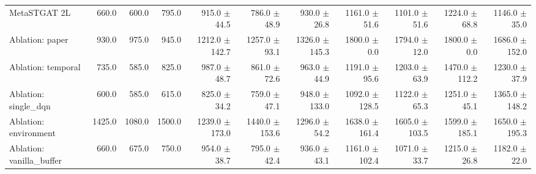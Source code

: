\begin{table}
\begin{tabular}{@{}lrrrrrrrrrr@{}}
    MetaSTGAT 2L              & 660.0   & 600.0   & 795.0   & 915.0 {\fontsize{4}{4}\selectfont$\pm$44.5}   & 786.0 {\fontsize{4}{4}\selectfont$\pm$48.9}   & 930.0 {\fontsize{4}{4}\selectfont$\pm$26.8}   & 1161.0 {\fontsize{4}{4}\selectfont$\pm$51.6}  & 1101.0 {\fontsize{4}{4}\selectfont$\pm$51.6}  & 1224.0 {\fontsize{4}{4}\selectfont$\pm$68.8}  & 1146.0 {\fontsize{4}{4}\selectfont$\pm$35.0}  \\
    Ablation: paper           & 930.0   & 975.0   & 945.0   & 1212.0 {\fontsize{4}{4}\selectfont$\pm$142.7} & 1257.0 {\fontsize{4}{4}\selectfont$\pm$93.1}  & 1326.0 {\fontsize{4}{4}\selectfont$\pm$145.3} & 1800.0 {\fontsize{4}{4}\selectfont$\pm$0.0}   & 1794.0 {\fontsize{4}{4}\selectfont$\pm$12.0}  & 1800.0 {\fontsize{4}{4}\selectfont$\pm$0.0}   & 1686.0 {\fontsize{4}{4}\selectfont$\pm$152.0} \\
    Ablation: temporal        & 735.0   & 585.0   & 825.0   & 987.0 {\fontsize{4}{4}\selectfont$\pm$48.7}   & 861.0 {\fontsize{4}{4}\selectfont$\pm$72.6}   & 963.0 {\fontsize{4}{4}\selectfont$\pm$44.9}   & 1191.0 {\fontsize{4}{4}\selectfont$\pm$95.6}  & 1203.0 {\fontsize{4}{4}\selectfont$\pm$63.9}  & 1470.0 {\fontsize{4}{4}\selectfont$\pm$112.2} & 1230.0 {\fontsize{4}{4}\selectfont$\pm$37.9}  \\
    Ablation: single\_dqn     & 600.0   & 585.0   & 615.0   & 825.0 {\fontsize{4}{4}\selectfont$\pm$34.2}   & 759.0 {\fontsize{4}{4}\selectfont$\pm$47.1}   & 948.0 {\fontsize{4}{4}\selectfont$\pm$133.0}  & 1092.0 {\fontsize{4}{4}\selectfont$\pm$128.5} & 1122.0 {\fontsize{4}{4}\selectfont$\pm$65.3}  & 1251.0 {\fontsize{4}{4}\selectfont$\pm$45.1}  & 1365.0 {\fontsize{4}{4}\selectfont$\pm$148.2} \\
    Ablation: environment     & 1425.0  & 1080.0  & 1500.0  & 1239.0 {\fontsize{4}{4}\selectfont$\pm$173.0} & 1440.0 {\fontsize{4}{4}\selectfont$\pm$153.6} & 1296.0 {\fontsize{4}{4}\selectfont$\pm$54.2}  & 1638.0 {\fontsize{4}{4}\selectfont$\pm$161.4} & 1605.0 {\fontsize{4}{4}\selectfont$\pm$103.5} & 1599.0 {\fontsize{4}{4}\selectfont$\pm$185.1} & 1650.0 {\fontsize{4}{4}\selectfont$\pm$195.3} \\
    Ablation: vanilla\_buffer & 660.0   & 675.0   & 750.0   & 954.0 {\fontsize{4}{4}\selectfont$\pm$38.7}   & 795.0 {\fontsize{4}{4}\selectfont$\pm$42.4}   & 936.0 {\fontsize{4}{4}\selectfont$\pm$43.1}   & 1161.0 {\fontsize{4}{4}\selectfont$\pm$102.4} & 1071.0 {\fontsize{4}{4}\selectfont$\pm$33.7}  & 1215.0 {\fontsize{4}{4}\selectfont$\pm$26.8}  & 1182.0 {\fontsize{4}{4}\selectfont$\pm$22.0}  \\

\end{tabular}
\end{table}
